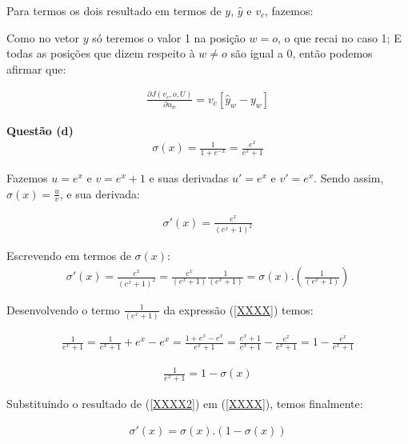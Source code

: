 \documentclass[a4paper,12pt]{article}
\begin{document}
Para termos os dois resultado em termos de $y$, $\hat{y}$ e $v_c$, fazemos:

Como no vetor $y$ só teremos o valor 1 na posição $w = o$, o que recai no caso 1; E todas as posições que dizem respeito à $w \neq o$ são igual a 0, então podemos afirmar que:

\begin{align}\label{q_dezen}
\frac{\partial J(v_c, o, U) }{\partial u_{w}} = v_c [\hat{y}_{w} - y_{w}] 
\end{align}


{\Large \textbf{Questão (d)}}\\

\begin{align}
\sigma (x) = \frac{ 1 }{ 1 + e^{-x} } = \frac{ e^{x} }{ e^{x} + 1 }
\end{align}

Fazemos $u= e^{x} $ e  $v= e^{x} + 1$ e suas derivadas $u' = e^{x} $ e $v' = e^{x}$. Sendo assim, $\sigma (x) = \frac{ u }{ v }$, e sua derivada:


\begin{align}
\sigma' (x) = \frac{ e^{x} }{ (e^{x} +1)^2 }
\end{align}

Escrevendo em termos de $\sigma (x)$:
\begin{align}\label{XXXX}
\sigma' (x) = \frac{ e^{x} }{ (e^{x} +1)^2 } = \frac{ e^{x} }{ (e^{x} +1) } \frac{ 1 }{ (e^{x} +1) } = \sigma (x) .( \frac{ 1 }{ (e^{x} +1) } )
\end{align}

Desenvolvendo o termo $\frac{ 1 }{ (e^{x} +1) }$ da expressão (\ref{XXXX}) temos:

\begin{align}
\frac{ 1 }{ e^{x} +1 } = \frac{ 1 }{ e^{x} +1 } + e^{x} - e^{x} = \frac{ 1 + e^{x} - e^{x} }{ e^{x} +1 } = \frac{ e^{x} + 1 }{ e^{x} +1 } - \frac{ e^{x} }{ e^{x} +1 } =  1 - \frac{ e^{x} }{ e^{x} +1 }
\end{align}

\begin{align}\label{XXXX2}
\frac{ 1 }{ e^{x} +1 } = 1 - \sigma (x)
\end{align}

Substituindo o resultado de (\ref{XXXX2}) em (\ref{XXXX}), temos finalmente:

\begin{align}\label{XXXX}
\sigma' (x) = \sigma (x) .( 1 - \sigma (x) )
\end{align}
\end{document}
